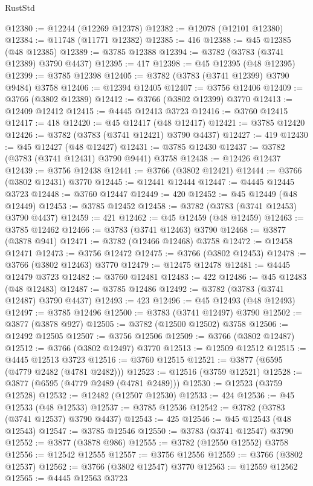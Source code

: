 \begin{lexlean}{RustStd}
\begin{coremodule}
@12380 := @12244 (@12269 @12378)
@12382 := @12078 (@12101 @12380)
@12384 := @11748 (@11771 @12382)
@12385 := 416
@12388 := @45 @12385 (@48 @12385)
@12389 := @3785 @12388
@12394 := @3782 (@3783 (@3741 @12389) @3790 @4437)
@12395 := 417
@12398 := @45 @12395 (@48 @12395)
@12399 := @3785 @12398
@12405 := @3782 (@3783 (@3741 @12399) @3790 @9484) @3758
@12406 := @12394 @12405
@12407 := @3756 @12406
@12409 := @3766 (@3802 @12389)
@12412 := @3766 (@3802 @12399) @3770
@12413 := @12409 @12412
@12415 := @4445 @12413 @3723
@12416 := @3760 @12415
@12417 := 418
@12420 := @45 @12417 (@48 @12417)
@12421 := @3785 @12420
@12426 := @3782 (@3783 (@3741 @12421) @3790 @4437)
@12427 := 419
@12430 := @45 @12427 (@48 @12427)
@12431 := @3785 @12430
@12437 := @3782 (@3783 (@3741 @12431) @3790 @9441) @3758
@12438 := @12426 @12437
@12439 := @3756 @12438
@12441 := @3766 (@3802 @12421)
@12444 := @3766 (@3802 @12431) @3770
@12445 := @12441 @12444
@12447 := @4445 @12445 @3723
@12448 := @3760 @12447
@12449 := 420
@12452 := @45 @12449 (@48 @12449)
@12453 := @3785 @12452
@12458 := @3782 (@3783 (@3741 @12453) @3790 @4437)
@12459 := 421
@12462 := @45 @12459 (@48 @12459)
@12463 := @3785 @12462
@12466 := @3783 (@3741 @12463) @3790
@12468 := @3877 (@3878 @941)
@12471 := @3782 (@12466 @12468) @3758
@12472 := @12458 @12471
@12473 := @3756 @12472
@12475 := @3766 (@3802 @12453)
@12478 := @3766 (@3802 @12463) @3770
@12479 := @12475 @12478
@12481 := @4445 @12479 @3723
@12482 := @3760 @12481
@12483 := 422
@12486 := @45 @12483 (@48 @12483)
@12487 := @3785 @12486
@12492 := @3782 (@3783 (@3741 @12487) @3790 @4437)
@12493 := 423
@12496 := @45 @12493 (@48 @12493)
@12497 := @3785 @12496
@12500 := @3783 (@3741 @12497) @3790
@12502 := @3877 (@3878 @927)
@12505 := @3782 (@12500 @12502) @3758
@12506 := @12492 @12505
@12507 := @3756 @12506
@12509 := @3766 (@3802 @12487)
@12512 := @3766 (@3802 @12497) @3770
@12513 := @12509 @12512
@12515 := @4445 @12513 @3723
@12516 := @3760 @12515
@12521 := @3877 (@6595 (@4779 @2482 (@4781 @2482)))
@12523 := @12516 (@3759 @12521)
@12528 := @3877 (@6595 (@4779 @2489 (@4781 @2489)))
@12530 := @12523 (@3759 @12528)
@12532 := @12482 (@12507 @12530)
@12533 := 424
@12536 := @45 @12533 (@48 @12533)
@12537 := @3785 @12536
@12542 := @3782 (@3783 (@3741 @12537) @3790 @4437)
@12543 := 425
@12546 := @45 @12543 (@48 @12543)
@12547 := @3785 @12546
@12550 := @3783 (@3741 @12547) @3790
@12552 := @3877 (@3878 @986)
@12555 := @3782 (@12550 @12552) @3758
@12556 := @12542 @12555
@12557 := @3756 @12556
@12559 := @3766 (@3802 @12537)
@12562 := @3766 (@3802 @12547) @3770
@12563 := @12559 @12562
@12565 := @4445 @12563 @3723

\end{coremodule}
\end{lexlean}
